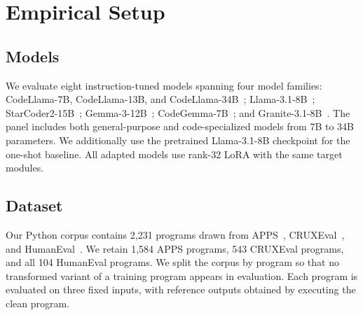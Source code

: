 \section{Empirical Setup}
\label{sec:setup}






\subsection{Models}

We evaluate eight instruction-tuned models spanning four model families:
CodeLlama-7B, CodeLlama-13B, and CodeLlama-34B~\cite{code_llama};
Llama-3.1-8B~\cite{llama3herd};
StarCoder2-15B~\cite{lozhkov2024starcoder2stackv2};
Gemma-3-12B~\cite{gemma3};
CodeGemma-7B~\cite{codegemma}; and
Granite-3.1-8B~\cite{granite31}.
The panel includes both general-purpose and code-specialized models from
7B to 34B parameters. We additionally use the pretrained Llama-3.1-8B
checkpoint for the one-shot baseline. All adapted models use rank-32 LoRA
with the same target modules.


\subsection{Dataset}

Our Python corpus contains 2,231 programs drawn from
APPS~\cite{hendrycks2021apps},
CRUXEval~\cite{cruxeval}, and
HumanEval~\cite{Chen2021}.
We retain 1,584 APPS programs, 543 CRUXEval programs, and all 104
HumanEval programs. We split the corpus by program so that no transformed
variant of a training program appears in evaluation. Each program is evaluated
on three fixed inputs, with reference outputs obtained by executing the clean
program.

